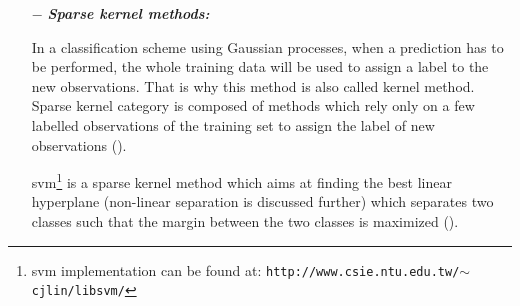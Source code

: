 \begin{enumerate}[leftmargin=*]
\item[$-$] \textbf{\textit{Sparse kernel methods:}}

In a classification scheme using Gaussian processes, when a prediction has to be performed, the whole training data will be used to assign a label to the new observations. That is why this method is also called kernel method. Sparse kernel category is composed of methods which rely only on a few labelled observations of the training set to assign the label of new observations (\cite{Bishop2006}).

\Acf{svm}\footnote{\ac{svm} implementation can be found at: \texttt{http://www.csie.ntu.edu.tw/\allowbreak $\sim$cjlin/libsvm/}} is a sparse kernel method which aims at finding the best linear hyperplane (non-linear separation is discussed further) which separates two classes such that the margin between the two classes is maximized (\cite{Vapnik1963}).%
%
%
%
%

\end{enumerate}

